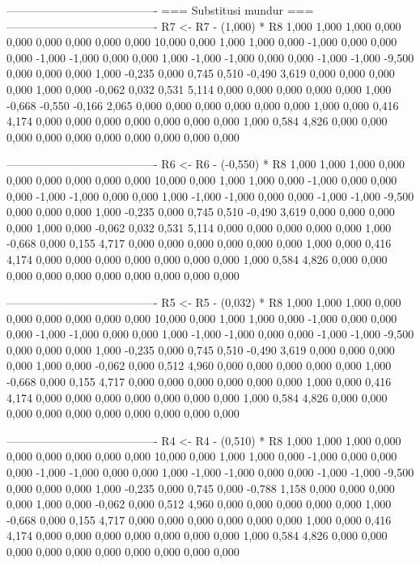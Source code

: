 \documentclass[12pt]{article}
\begin{document}
\begin{enumerate}
\begin{keluaran}
----------------------------------------
=== Substitusi mundur ===
----------------------------------------
R7 <- R7 - (1,000) * R8
1,000   1,000   1,000   0,000   0,000   0,000   0,000   0,000   0,000   10,000
0,000   1,000   1,000   0,000   -1,000  0,000   0,000   0,000   -1,000  -1,000
0,000   0,000   1,000   -1,000  -1,000  0,000   0,000   -1,000  -1,000  -9,500
0,000   0,000   0,000   1,000   -0,235  0,000   0,745   0,510   -0,490  3,619
0,000   0,000   0,000   0,000   1,000   0,000   -0,062  0,032   0,531   5,114
0,000   0,000   0,000   0,000   0,000   1,000   -0,668  -0,550  -0,166  2,065
0,000   0,000   0,000   0,000   0,000   0,000   1,000   0,000   0,416   4,174
0,000   0,000   0,000   0,000   0,000   0,000   0,000   1,000   0,584   4,826
0,000   0,000   0,000   0,000   0,000   0,000   0,000   0,000   0,000   0,000

----------------------------------------
R6 <- R6 - (-0,550) * R8
1,000   1,000   1,000   0,000   0,000   0,000   0,000   0,000   0,000   10,000
0,000   1,000   1,000   0,000   -1,000  0,000   0,000   0,000   -1,000  -1,000
0,000   0,000   1,000   -1,000  -1,000  0,000   0,000   -1,000  -1,000  -9,500
0,000   0,000   0,000   1,000   -0,235  0,000   0,745   0,510   -0,490  3,619
0,000   0,000   0,000   0,000   1,000   0,000   -0,062  0,032   0,531   5,114
0,000   0,000   0,000   0,000   0,000   1,000   -0,668  0,000   0,155   4,717
0,000   0,000   0,000   0,000   0,000   0,000   1,000   0,000   0,416   4,174
0,000   0,000   0,000   0,000   0,000   0,000   0,000   1,000   0,584   4,826
0,000   0,000   0,000   0,000   0,000   0,000   0,000   0,000   0,000   0,000

----------------------------------------
R5 <- R5 - (0,032) * R8
1,000   1,000   1,000   0,000   0,000   0,000   0,000   0,000   0,000   10,000
0,000   1,000   1,000   0,000   -1,000  0,000   0,000   0,000   -1,000  -1,000
0,000   0,000   1,000   -1,000  -1,000  0,000   0,000   -1,000  -1,000  -9,500
0,000   0,000   0,000   1,000   -0,235  0,000   0,745   0,510   -0,490  3,619
0,000   0,000   0,000   0,000   1,000   0,000   -0,062  0,000   0,512   4,960
0,000   0,000   0,000   0,000   0,000   1,000   -0,668  0,000   0,155   4,717
0,000   0,000   0,000   0,000   0,000   0,000   1,000   0,000   0,416   4,174
0,000   0,000   0,000   0,000   0,000   0,000   0,000   1,000   0,584   4,826
0,000   0,000   0,000   0,000   0,000   0,000   0,000   0,000   0,000   0,000

----------------------------------------
R4 <- R4 - (0,510) * R8
1,000   1,000   1,000   0,000   0,000   0,000   0,000   0,000   0,000   10,000
0,000   1,000   1,000   0,000   -1,000  0,000   0,000   0,000   -1,000  -1,000
0,000   0,000   1,000   -1,000  -1,000  0,000   0,000   -1,000  -1,000  -9,500
0,000   0,000   0,000   1,000   -0,235  0,000   0,745   0,000   -0,788  1,158
0,000   0,000   0,000   0,000   1,000   0,000   -0,062  0,000   0,512   4,960
0,000   0,000   0,000   0,000   0,000   1,000   -0,668  0,000   0,155   4,717
0,000   0,000   0,000   0,000   0,000   0,000   1,000   0,000   0,416   4,174
0,000   0,000   0,000   0,000   0,000   0,000   0,000   1,000   0,584   4,826
0,000   0,000   0,000   0,000   0,000   0,000   0,000   0,000   0,000   0,000


\end{keluaran}
\end{enumerate}
\end{document}
